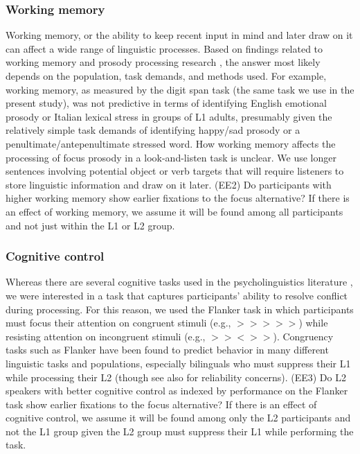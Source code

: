 \subsubsection{Working memory}
Working memory, or the ability to keep recent input in mind and later draw on it \parencite[see][]{baddeley2003working,carpenter2013role} can affect a wide range of linguistic processes. Based on findings related to working memory and prosody processing research \parencite[e.g.,][]{traxler2009hierarchical,ferreira2015prosody, bishop2021exploring}, the answer most likely depends on the population, task demands, and methods used. For example, working memory, as measured by the digit span task (the same task we use in the present study), was not predictive in terms of identifying English emotional prosody \parencite{sinagra2022perception} or Italian lexical stress \parencite{ppcc} in groups of L1 adults, presumably given the relatively simple task demands of identifying happy/sad prosody or a penultimate/antepenultimate stressed word. How working memory affects the processing of focus prosody in a look-and-listen task is unclear. We use longer sentences involving potential object or verb targets that will require listeners to store linguistic information and draw on it later. (EE2) Do participants with higher working memory show earlier fixations to the focus alternative? If there is an effect of working memory, we assume it will be found among all participants and not just within the L1 or L2 group.


\subsubsection{Cognitive control}
Whereas there are several cognitive tasks used in the psycholinguistics literature \parencite{ness2023state}, we were interested in a task that captures participants' ability to resolve conflict during processing. For this reason, we used the Flanker task \parencite{eriksen1974effects} in which 
participants must focus their attention on congruent stimuli (e.g., $>>>>>$) while resisting attention on incongruent stimuli (e.g., $>><>>$). Congruency tasks such as Flanker have been found to predict behavior in many different linguistic tasks and populations, especially bilinguals who must suppress their L1 while processing their L2 \parencite{blumenfeld2014cognitive,luk2011there} (though see also \cite{hedge2018reliability} for reliability concerns). (EE3) Do L2 speakers with better cognitive control as indexed by performance on the Flanker task show earlier fixations to the focus alternative? If there is an effect of cognitive control, we assume it will be found among only the L2 participants and not the L1 group given the L2 group must suppress their L1 while performing the task.




